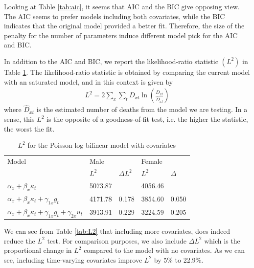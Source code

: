 \documentclass[AER, draftmode]{AEA}
\begin{document}
Looking at Table \ref{tab:aic}, it seems that AIC and the BIC give opposing view. The AIC seems to prefer models including both covariates, while the BIC indicates that the original model provided a better fit. Therefore, the size of the penalty for the number of parameters induce different model pick for the AIC and BIC.

In addition to the AIC and BIC, we report the likelihood-ratio statistic $(L^2)$ in Table \ref{tab:l2}. The likelihood-ratio statistic is obtained by comparing the current model with an saturated model, and in this context is given by
\begin{align}
	L^2 = 2 \sum_{x} \sum_t D_{xt} \ln \left( \frac{D_{xt}}{\hat{D}_{xt}} \right)
\end{align}
where $\hat{D}_{xt}$ is the estimated number of deaths from the model we are testing. In a sense, this $L^2$ is the opposite of a goodness-of-fit test, i.e. the higher the statistic, the worst the fit.

\begin{table}[!htp]
	\centering
	\caption{$L^2$ for the Poisson log-bilinear model with covariates}
	\label{tab:l2}
	\begin{tabular}{lllll}
	\hline
	Model                                                              & \multicolumn{2}{l}{Male} & \multicolumn{2}{l}{Female} \\ \cline{2-5} 
	& $L^2$    & $\Delta L^2$ & $L^2$       & $\Delta$    \\ \hline
	$\alpha_x + \beta_x \kappa_t$                                      & 5073.87  &              & 4056.46     &             \\
	$\alpha_x + \beta_x \kappa_t + \gamma_{1x} g_t$                    & 4171.78  & 0.178        & 3854.60     & 0.050       \\
	$ \alpha_x + \beta_x \kappa_t + \gamma_{1x} g_t + \gamma_{2x} u_t$ & 3913.91  & 0.229        & 3224.59     & 0.205       \\ \hline
	\end{tabular}
\end{table}

We can see from Table \ref{tab:L2} that including more covariates, does indeed reduce the $L^2$ test. For comparison purposes, we also include $\Delta L^2$ which is the proportional change in $L^2$ compared to the model with no covariates. As we can see, including time-varying covariates improve $L^2$ by 5\% to 22.9\%.
\end{document}
